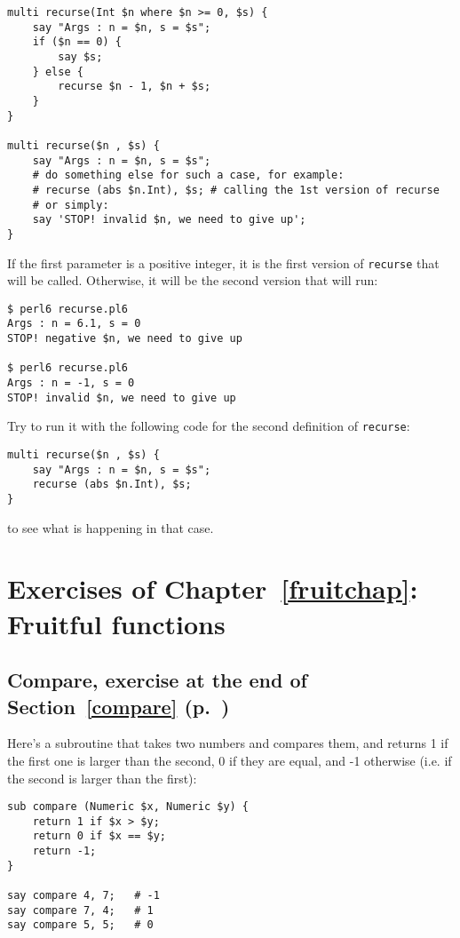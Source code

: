 \begin{verbatim}
multi recurse(Int $n where $n >= 0, $s) {
    say "Args : n = $n, s = $s";
    if ($n == 0) {
        say $s;
    } else {
        recurse $n - 1, $n + $s;
    }
}

multi recurse($n , $s) {
    say "Args : n = $n, s = $s";
    # do something else for such a case, for example:
    # recurse (abs $n.Int), $s; # calling the 1st version of recurse
    # or simply:
    say 'STOP! invalid $n, we need to give up';
}
\end{verbatim}

If the first parameter is a positive integer, it is the 
first version of {\tt recurse} that will be called. 
Otherwise, it will be the second version that will run:

\begin{verbatim}
$ perl6 recurse.pl6
Args : n = 6.1, s = 0
STOP! negative $n, we need to give up

$ perl6 recurse.pl6
Args : n = -1, s = 0
STOP! invalid $n, we need to give up
\end{verbatim}
%

Try to run it with the following code for the second 
definition of {\tt recurse}:

\begin{verbatim}
multi recurse($n , $s) {
    say "Args : n = $n, s = $s";
    recurse (abs $n.Int), $s;
}
\end{verbatim}
%
to see what is happening in that case.

\section{Exercises of Chapter~\ref{fruitchap}: Fruitful functions}

\subsection{Compare, exercise at the end of Section~\ref{compare} (p.~\pageref{compare})}
\label{sol_compare}

Here's a subroutine that takes two numbers and compares them, 
and returns 1 if the first one is larger than the second, 0 if 
they are equal, and -1 otherwise (i.e. if the second is larger 
than the first):

\begin{verbatim}
sub compare (Numeric $x, Numeric $y) {
    return 1 if $x > $y;
    return 0 if $x == $y;
    return -1;
}

say compare 4, 7;   # -1
say compare 7, 4;   # 1
say compare 5, 5;   # 0
\end{verbatim}

